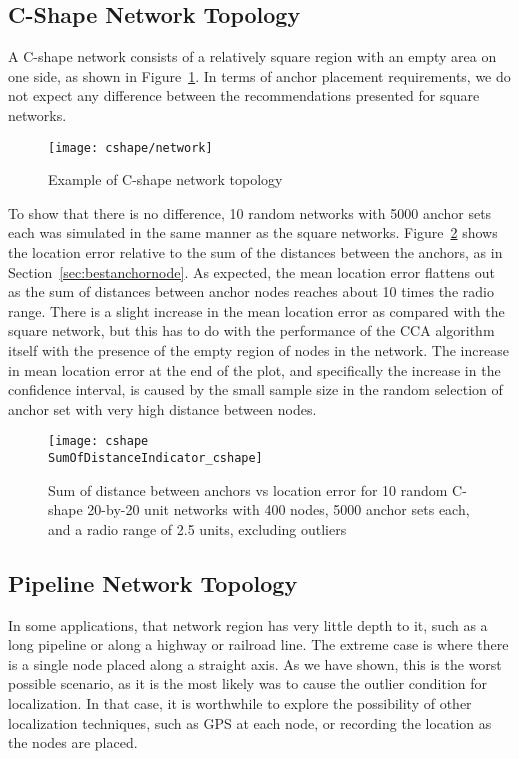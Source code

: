 \subsection{C-Shape Network Topology}

A C-shape network consists of a relatively square region with an empty area on one side, as shown in Figure~\ref{fig:cnetwork}.  In terms of anchor placement requirements, we do not expect any difference between the recommendations presented for square networks.

\begin{figure}
  \centering
	\texttt{[image: cshape/network]}
	\caption{Example of C-shape network topology}
	\label{fig:cnetwork}
\end{figure}

To show that there is no difference, 10 random networks with 5000 anchor sets each was simulated in the same manner as the square networks.  Figure~\ref{fig:cindicator} shows the location error relative to the sum of the distances between the anchors, as in Section~\ref{sec:bestanchornode}. 
As expected, the mean location error flattens out as the sum of distances between anchor nodes reaches about 10 times the radio range.  There is a slight increase in the mean location error as compared with the square network, but this has to do with the performance of the CCA algorithm itself with the presence of the empty region of nodes in the network.  The increase in mean location error at the end of the plot, and specifically the increase in the confidence interval, is caused by the small sample size in the random selection of anchor set with very high distance between nodes. 

\begin{figure}
  \centering
	\texttt{[image: cshape\\SumOfDistanceIndicator\_cshape]}
	\caption[Sum of distance between anchors vs location error in a C-Shape topology]{Sum of distance between anchors vs location error for 10 random C-shape 20-by-20 unit networks with 400 nodes, 5000 anchor sets each, and a radio range of 2.5 units, excluding outliers}
	\label{fig:cindicator}
\end{figure}

\subsection{Pipeline Network Topology}

In some applications, that network region has very little depth to it, such as a long pipeline or along a highway or railroad line.  The extreme case is where there is a single node placed along a straight axis.  As we have shown, this is the worst possible scenario, as it is the most likely was to cause the outlier condition for localization.  In that case, it is worthwhile to explore the possibility of other localization techniques, such as GPS at each node, or recording the location as the nodes are placed.  

